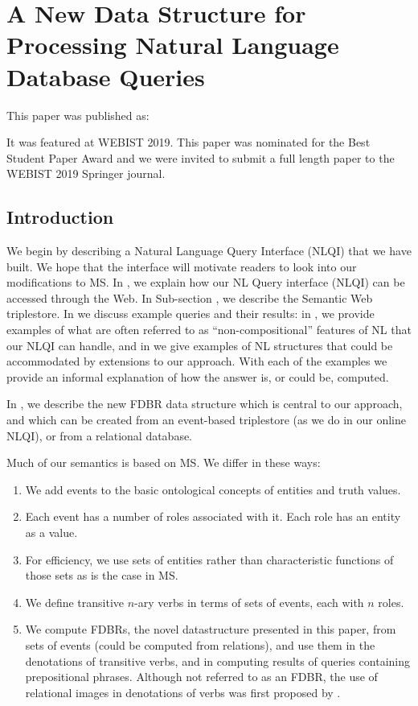 \documentclass[../main.tex]{subfiles}
\begin{document}
\chapter{A New Data Structure for Processing Natural Language Database Queries}
\begin{refsection}
	
This paper was published as:


It was featured at WEBIST 2019.  This paper was nominated for the Best Student Paper Award and we were invited to submit a full length paper to the WEBIST 2019 Springer journal.

\label{chapter:webist2019conf}


\section{Introduction}
We begin by describing a Natural Language Query Interface (NLQI) that we have built. We hope that the interface will motivate readers to look into our modifications to MS. In , we explain how our NL Query  interface (NLQI) can be accessed through the Web. In Sub-section , we describe the Semantic Web triplestore. In  we discuss example queries and their results: in , we provide  examples of what are often referred to as ``non-compositional'' features of NL  that our NLQI can handle, and in  we give  examples of NL structures that could be accommodated by extensions to our approach. With each of the examples we provide an informal explanation of how the answer is, or could be, computed.

In , we describe the new FDBR data structure which is central to our approach, and which can be created from an event-based triplestore (as we do in our online NLQI), or from a relational database.

Much of our semantics is based on MS. We differ in these ways:
\begin{enumerate}
	\item We add events to the basic ontological concepts of entities and truth values.
	\item Each event has a number of roles associated with it. Each role has an entity as a value.
	\item For efficiency, we use sets of entities rather than characteristic functions of those sets as is the case in MS.
	\item We define transitive $n$-ary verbs in terms of sets of events, each with $n$ roles.
	\item We compute FDBRs, the novel datastructure presented in this paper, from sets of events (could be computed from relations), and use them in the denotations of transitive verbs, and in computing results of queries containing prepositional phrases. Although not referred to as an FDBR, the use of relational images in denotations of verbs was first proposed by \cite{frost1989constructing}.
\end{enumerate}


\end{refsection}
\end{document}
